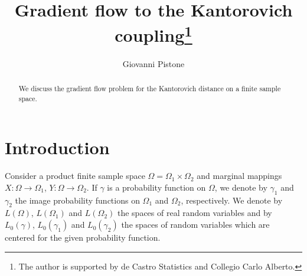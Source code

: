 \documentclass[runningheads]{llncs}
\begin{document}
%
\title{Gradient flow to the Kantorovich coupling\thanks{The author is
    supported by de Castro Statistics and Collegio Carlo Alberto.}}
%
%
\author{Giovanni Pistone}
%
%
%
\maketitle              %
%
\begin{abstract}
We discuss the gradient flow problem for the Kantorovich distance on a
finite sample space.

\end{abstract}
%
%
%
\section{Introduction}
Consider a product finite sample space
$\Omega=\Omega_1 \times \Omega_2$ and marginal mappings
$X \colon \Omega \to \Omega_1$, $Y \colon \Omega \to \Omega_2$. If
$\gamma$ is a probability function on $\Omega$, we denote by
$\gamma_1$ and $\gamma_2$ the image probability functions on
$\Omega_1$ and $\Omega_2$, respectively. We denote by $L(\Omega)$,
$L(\Omega_1)$ and $L(\Omega_2)$ the spaces of real random variables
and by $L_0(\gamma)$, $L_0(\gamma_1)$ and $L_0(\gamma_2)$ the spaces
of random variables which are centered for the given probability
function.
\end{document}
